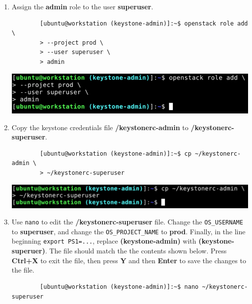 \documentclass[letterpaper, 12pt]{article}
\begin{document}
\begin{enumerate}
    \item Assign the \textbf{admin} role to the user \textbf{superuser}.
    \begin{lstlisting}
        [ubuntu@workstation (keystone-admin)]:~$ openstack role add \
        > --project prod \
        > --user superuser \
        > admin
    \end{lstlisting}

    \begin{center}
        \includegraphics[width=\linewidth]{images/part1/step6.png}
    \end{center}

    \item Copy the keystone credentials file \textbf{\texttildemid/keystonerc-admin} to
    \textbf{\texttildemid/keystonerc-superuser}.
    \begin{lstlisting}
        [ubuntu@workstation (keystone-admin)]:~$ cp ~/keystonerc-admin \
        > ~/keystonerc-superuser
    \end{lstlisting}

    \begin{center}
        \includegraphics[width=\linewidth]{images/part1/step7.png}
    \end{center}

    \item Use \texttt{nano} to edit the \textbf{\texttildemid/keystonerc-superuser} file. Change the
    \texttt{OS\_USERNAME} to \textbf{superuser}, and change the \texttt{OS\_PROJECT\_NAME} to \textbf{prod}. Finally,
    in the line beginning \texttt{export PS1=...}, replace \textbf{(keystone-admin)} with \textbf{(keystone-superuer)}.
    The file should match the the contents shown below. Press \textbf{Ctrl+X} to exit the file, then press \textbf{Y}
    and then \textbf{Enter} to save the changes to the file.
    \begin{lstlisting}
        [ubuntu@workstation (keystone-admin)]:~$ nano ~/keystonerc-superuser
    \end{lstlisting}    


\end{enumerate}
\end{document}

